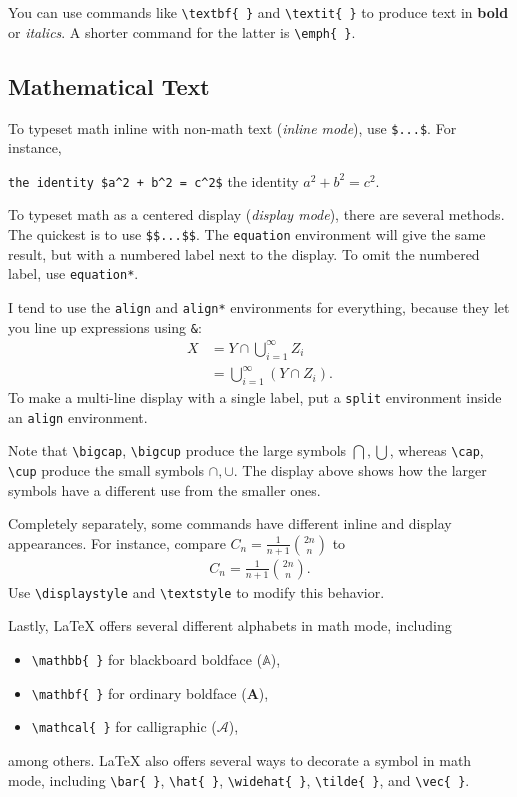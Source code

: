 \documentclass[a4paper,10pt,leqno]{article}
\numberwithin{equation}{section}
\theoremstyle{plain}
\theoremstyle{definition}
\theoremstyle{remark}
\begin{document}
You can use commands like \verb|\textbf{ }| and  \verb|\textit{ }| to produce text in \textbf{bold} or \textit{italics}.
A shorter command for the latter is \verb|\emph{ }|.

\subsection{Mathematical Text}

To typeset math inline with non-math text (\emph{inline mode}), use \verb|$...$|.
For instance,
\begin{center}
\verb|the identity $a^2 + b^2 = c^2$|
\quad
the identity $a^2 + b^2 = c^2$.
\end{center}
To typeset math as a centered display (\emph{display mode}), there are several methods.
The quickest is to use \verb|$$...$$|.
The \texttt{equation} environment will give the same result, but with a numbered label next to the display.
To omit the numbered label, use \texttt{equation*}.

I tend to use the \texttt{align} and \texttt{align*} environments for everything, because they let you line up expressions using \verb|&|:
\begin{align}\label{eq:1}
X 
	&= Y \cap \bigcup_{i = 1}^\infty Z_i\\
	&= \bigcup_{i = 1}^\infty {(Y \cap Z_i)}.
\end{align}
To make a multi-line display with a single label, put a \texttt{split} environment inside an \texttt{align} environment.

Note that \verb|\bigcap|, \verb|\bigcup| produce the large symbols $\bigcap, \bigcup$, whereas \verb|\cap|, \verb|\cup| produce the small symbols $\cap, \cup$.
The display above shows how the larger symbols have a different use from the smaller ones.

Completely separately, some commands have different inline and display appearances.
For instance, compare $C_n = \frac{1}{n + 1} \binom{2n}{n}$ to
\begin{align*}
C_n = \frac{1}{n + 1} \binom{2n}{n}.
\end{align*}
Use \verb|\displaystyle| and \verb|\textstyle| to modify this behavior.

Lastly, \LaTeX{} offers several different alphabets in math mode, including
\begin{itemize} 
\item 	\verb|\mathbb{ }| for blackboard boldface ($\mathbb{A}$),

\item 	\verb|\mathbf{ }| for ordinary boldface ($\mathbf{A}$), 

\item 	\verb|\mathcal{ }| for calligraphic ($\mathcal{A}$),

\end{itemize}
among others.
\LaTeX{} also offers several ways to decorate a symbol in math mode, including \verb|\bar{ }|, \verb|\hat{ }|, \verb|\widehat{ }|, \verb|\tilde{ }|, and \verb|\vec{ }|.
\end{document}
